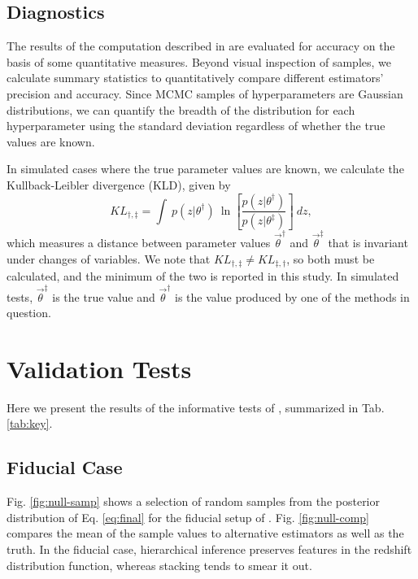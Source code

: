 \subsection{Diagnostics}

The results of the computation described in  are evaluated 
for accuracy on the basis of some quantitative measures.  Beyond visual 
inspection of samples, we calculate summary statistics to quantitatively 
compare different estimators' precision and accuracy.  Since MCMC samples of 
hyperparameters are Gaussian distributions, we can quantify the breadth of the 
distribution for each hyperparameter using the standard deviation regardless of 
whether the true values are known.  

In simulated cases where the true parameter values are known, we calculate the 
Kullback-Leibler divergence (KLD), given by 
\begin{equation}
\label{eq:kl}
KL_{\dagger,\ddagger} = \int\ p(z|\theta^{\dagger})\ 
\ln\left[\frac{p(z|\theta^{\dagger})}{p(z|\theta^{\ddagger})}\right]\ dz,
\end{equation}
which measures a distance between parameter values $\vec{\theta}^{\dagger}$ and 
$\vec{\theta}^{\ddagger}$ that is invariant under changes of variables.  We 
note that $KL_{\dagger,\ddagger}\neq KL_{\ddagger,\dagger}$, so both must be 
calculated, and the minimum of the two is reported in this study.  In simulated 
tests, $\vec{\theta}^{\ddagger}$ is the true value and $\vec{\theta}^{\dagger}$ 
is the value produced by one of the methods in question.  

\clearpage
\section{Validation Tests}

Here we present the results of the informative tests of , 
summarized in Tab. \ref{tab:key}.  

\subsection{Fiducial Case}

Fig. \ref{fig:null-samp} shows a selection of random samples from the posterior 
distribution of Eq. \ref{eq:final} for the fiducial setup of \Sect{sec:mock}.  Fig. \ref{fig:null-comp} compares the mean of the sample 
values to alternative estimators as well as the truth.  In the fiducial case, 
hierarchical inference preserves features in the redshift distribution 
function, whereas stacking tends to smear it out.  


